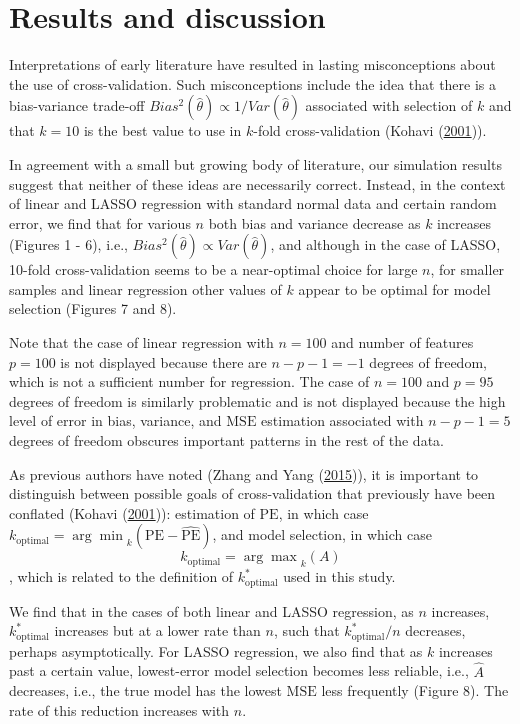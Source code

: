 \documentclass[
  12pt,
]{article}
\begin{document}
\hypertarget{results-and-discussion}{%
\section{Results and discussion}\label{results-and-discussion}}

Interpretations of early literature have resulted in lasting
misconceptions about the use of cross-validation. Such misconceptions
include the idea that there is a bias-variance trade-off
\(Bias^2(\hat{\theta}) \propto 1/Var(\hat{\theta})\) associated with
selection of \(k\) and that \(k = 10\) is the best value to use in
\(k\)-fold cross-validation (Kohavi
(\protect\hyperlink{ref-Kohavi2001}{2001})).

In agreement with a small but growing body of literature, our simulation
results suggest that neither of these ideas are necessarily correct.
Instead, in the context of linear and LASSO regression with standard
normal data and certain random error, we find that for various \(n\)
both bias and variance decrease as \(k\) increases (Figures 1 - 6),
i.e., \(Bias^2(\hat{\theta}) \propto Var(\hat{\theta})\), and although
in the case of LASSO, 10-fold cross-validation seems to be a
near-optimal choice for large \(n\), for smaller samples and linear
regression other values of \(k\) appear to be optimal for model
selection (Figures 7 and 8).

Note that the case of linear regression with \(n = 100\) and number of
features \(p = 100\) is not displayed because there are
\(n - p - 1 = -1\) degrees of freedom, which is not a sufficient number
for regression. The case of \(n = 100\) and \(p = 95\) degrees of
freedom is similarly problematic and is not displayed because the high
level of error in bias, variance, and \(\mathrm{MSE}\) estimation
associated with \(n - p - 1 = 5\) degrees of freedom obscures important
patterns in the rest of the data.

As previous authors have noted (Zhang and Yang
(\protect\hyperlink{ref-Zhang2015}{2015})), it is important to
distinguish between possible goals of cross-validation that previously
have been conflated (Kohavi (\protect\hyperlink{ref-Kohavi2001}{2001})):
estimation of \(\mathrm{PE}\), in which case
\(k_\mathrm{optimal} = {\arg\min}_{k}(\mathrm{PE} - \mathrm{\widehat{PE}})\),
and model selection, in which case
\[k_\mathrm{optimal} = {\arg\max}_k(A)\], which is related to the
definition of \(k_\mathrm{optimal}^*\) used in this study.

We find that in the cases of both linear and LASSO regression, as \(n\)
increases, \(k_\mathrm{optimal}^*\) increases but at a lower rate than
\(n\), such that \(k_\mathrm{optimal}^*/n\) decreases, perhaps
asymptotically. For LASSO regression, we also find that as \(k\)
increases past a certain value, lowest-error model selection becomes
less reliable, i.e., \(\hat{A}\) decreases, i.e., the true model has the
lowest \(\mathrm{MSE}\) less frequently (Figure 8). The rate of this
reduction increases with \(n\).
\end{document}
